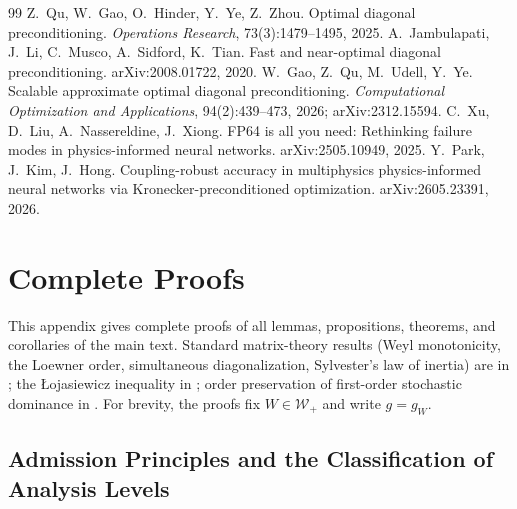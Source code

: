 \documentclass[11pt]{article}
\newcommand{\W}{W}
\numberwithin{equation}{section}
\begin{document}
\begin{thebibliography}{99}
 Z.~Qu, W.~Gao, O.~Hinder, Y.~Ye, Z.~Zhou. Optimal diagonal preconditioning. \emph{Operations Research}, 73(3):1479--1495, 2025.
 A.~Jambulapati, J.~Li, C.~Musco, A.~Sidford, K.~Tian. Fast and near-optimal diagonal preconditioning. arXiv:2008.01722, 2020.
 W.~Gao, Z.~Qu, M.~Udell, Y.~Ye. Scalable approximate optimal diagonal preconditioning. \emph{Computational Optimization and Applications}, 94(2):439--473, 2026; arXiv:2312.15594.
 C.~Xu, D.~Liu, A.~Nassereldine, J.~Xiong. FP64 is all you need: Rethinking failure modes in physics-informed neural networks. arXiv:2505.10949, 2025.
 Y.~Park, J.~Kim, J.~Hong. Coupling-robust accuracy in multiphysics physics-informed neural networks via Kronecker-preconditioned optimization. arXiv:2605.23391, 2026.
\end{thebibliography}
\appendix

\section{Complete Proofs}\label{app:proof}
\setcounter{subsection}{-1}
This appendix gives complete proofs of all lemmas, propositions, theorems, and corollaries of the main text. Standard matrix-theory results (Weyl monotonicity, the Loewner order, simultaneous diagonalization, Sylvester's law of inertia) are in \cite{Bhatia,HornJohnson}; the {\L}ojasiewicz inequality in \cite{AttouchBolte,LiuZhuBelkin2021,ZhouGeJin2021}; order preservation of first-order stochastic dominance in \cite{Strassen1965}. For brevity, the proofs fix $\W\in\mathcal W_+$ and write $g=g_{\W}$.

\subsection{Admission Principles and the Classification of Analysis Levels}
\end{document}
